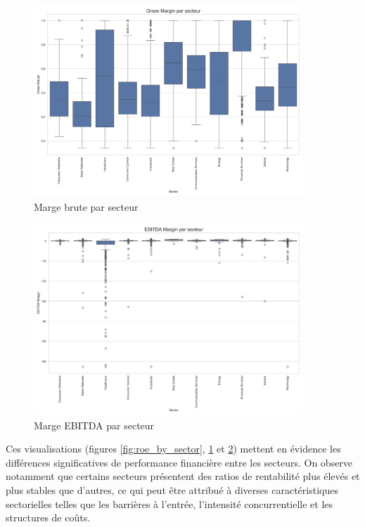 \documentclass[11pt]{report}
\begin{document}
\begin{figure}[H]
    \centering
    \includegraphics[width=0.9\textwidth]{figures/Gross_Margin_by_sector.png}
    \caption{Marge brute par secteur}
    \label{fig:gross_margin_by_sector}
\end{figure}

\begin{figure}[H]
    \centering
    \includegraphics[width=0.9\textwidth]{figures/EBITDA_Margin_by_sector.png}
    \caption{Marge EBITDA par secteur}
    \label{fig:ebitda_margin_by_sector}
\end{figure}

Ces visualisations (figures \ref{fig:roe_by_sector}, \ref{fig:gross_margin_by_sector} et \ref{fig:ebitda_margin_by_sector}) mettent en évidence les différences significatives de performance financière entre les secteurs. On observe notamment que certains secteurs présentent des ratios de rentabilité plus élevés et plus stables que d'autres, ce qui peut être attribué à diverses caractéristiques sectorielles telles que les barrières à l'entrée, l'intensité concurrentielle et les structures de coûts.
\end{document}
